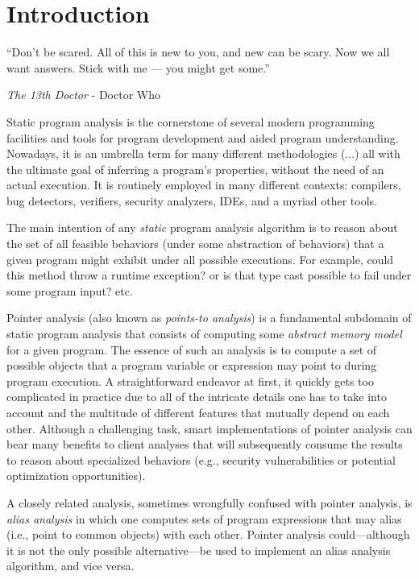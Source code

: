 \chapter{Introduction}\label{chapter:intro}

\epigraph{“Don’t be scared. All of this is new to you, and new can be scary. Now we all want answers. Stick with me — you might get some.”}{\textit{The 13th Doctor} - Doctor Who}

Static program analysis is the cornerstone of several modern programming
facilities and tools for program development and aided program understanding.
Nowadays, it is an umbrella term for many different methodologies (...) all
with the ultimate goal of inferring a program's properties, without the need of
an actual execution. It is routinely employed in many different contexts:
compilers, bug detectors, verifiers, security analyzers, IDEs, and a myriad
other tools.

The main intention of any \emph{static} program analysis algorithm is to reason
about the set of all feasible behaviors (under some abstraction of behaviors)
that a given program might exhibit under all possible executions. For example,
could this method throw a runtime exception? or is that type cast possible to
fail under some program input? etc.

Pointer analysis (also known as \emph{points-to analysis}) is a fundamental
subdomain of static program analysis that consists of computing some
\emph{abstract memory model} for a given program. The essence of such an
analysis is to compute a set of possible objects that a program variable or
expression may point to during program execution. A straightforward endeavor at
first, it quickly gets too complicated in practice due to all of the intricate
details one has to take into account and the multitude of different features
that mutually depend on each other. Although a challenging task, smart
implementations of pointer analysis can bear many benefits to client analyses
that will subsequently consume the results to reason about specialized
behaviors (e.g., security vulnerabilities or potential optimization
opportunities).

A closely related analysis, sometimes wrongfully confused with pointer
analysis, is \emph{alias analysis} in which one computes sets of program
expressions that may alias (i.e., point to common objects) with each other.
Pointer analysis could---although it is not the only possible alternative---be
used to implement an alias analysis algorithm, and vice versa.


